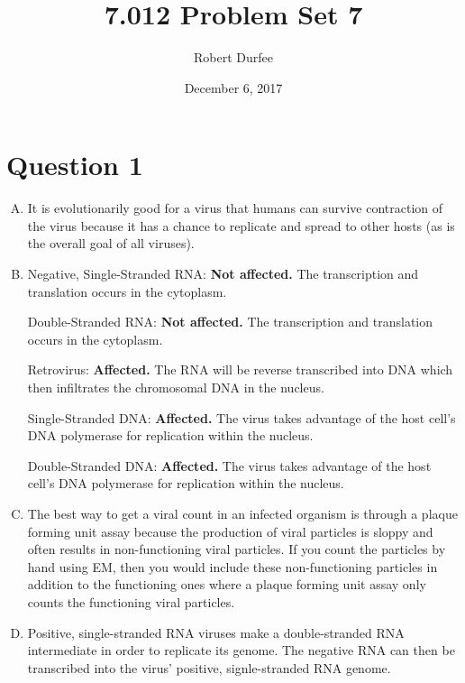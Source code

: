 \documentclass{article}
\title{ 7.012 Problem Set 7 }
\author{ Robert Durfee }
\date{ December 6, 2017 }
\begin{document}
\maketitle

\section*{ Question 1 }

\begin{enumerate}[A.]
    \item It is evolutionarily good for a virus that humans can survive
        contraction of the virus because it has a chance to replicate and spread
        to other hosts (as is the overall goal of all viruses).
        
    \item Negative, Single-Stranded RNA: \textbf{Not affected.} The
        transcription and translation occurs in the cytoplasm.

        Double-Stranded RNA: \textbf{Not affected.} The transcription and
        translation occurs in the cytoplasm.
        
        Retrovirus: \textbf{Affected.} The RNA will be reverse transcribed into
        DNA which then infiltrates the chromosomal DNA in the nucleus.
       
        Single-Stranded DNA: \textbf{Affected.} The virus takes advantage of the
        host cell's DNA polymerase for replication within the nucleus.
       
        Double-Stranded DNA: \textbf{Affected.} The virus takes advantage of the
        host cell's DNA polymerase for replication within the nucleus.

    \item The best way to get a viral count in an infected organism is through a
        plaque forming unit assay because the production of viral particles is
        sloppy and often results in non-functioning viral particles. If you
        count the particles by hand using EM, then you would include these
        non-functioning particles in addition to the functioning ones where a
        plaque forming unit assay only counts the functioning viral particles.

    \item Positive, single-stranded RNA viruses make a double-stranded RNA
        intermediate in order to replicate its genome. The negative RNA can then
        be transcribed into the virus' positive, signle-stranded RNA genome.

\end{enumerate}
\end{document}
